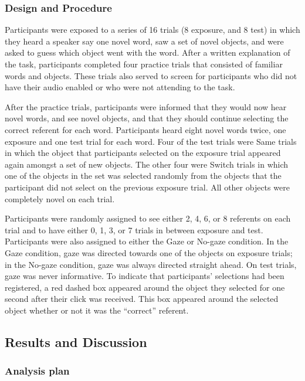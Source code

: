 \documentclass[a4paper,man,floatsintext]{apa6}
\begin{document}
\subsubsection{Design and Procedure}\label{design-and-procedure}

Participants were exposed to a series of 16 trials (8 exposure, and 8
test) in which they heard a speaker say one novel word, saw a set of
novel objects, and were asked to guess which object went with the word.
After a written explanation of the task, participants completed four
practice trials that consisted of familiar words and objects. These
trials also served to screen for participants who did not have their
audio enabled or who were not attending to the task.

After the practice trials, participants were informed that they would
now hear novel words, and see novel objects, and that they should
continue selecting the correct referent for each word. Participants
heard eight novel words twice, one exposure and one test trial for each
word. Four of the test trials were Same trials in which the object that
participants selected on the exposure trial appeared again amongst a set
of new objects. The other four were Switch trials in which one of the
objects in the set was selected randomly from the objects that the
participant did not select on the previous exposure trial. All other
objects were completely novel on each trial.

Participants were randomly assigned to see either 2, 4, 6, or 8
referents on each trial and to have either 0, 1, 3, or 7 trials in
between exposure and test. Participants were also assigned to either the
Gaze or No-gaze condition. In the Gaze condition, gaze was directed
towards one of the objects on exposure trials; in the No-gaze condition,
gaze was always directed straight ahead. On test trials, gaze was never
informative. To indicate that participants' selections had been
registered, a red dashed box appeared around the object they selected
for one second after their click was received. This box appeared around
the selected object whether or not it was the ``correct'' referent.

\subsection{Results and Discussion}\label{results-and-discussion}

\subsubsection{Analysis plan}\label{analysis-plan}
\end{document}
